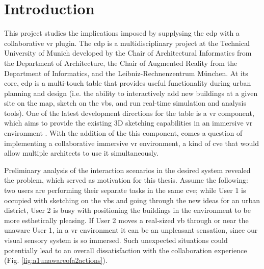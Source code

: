 
\chapter{Introduction}





This project studies the implications imposed by supplysing the \gls{cdp} with a collaborative \gls{vr} plugin.
The \gls{cdp} is a multidisciplinary project at the Technical University of Munich developed by the Chair of Architectural Informatics from the Department of Architecture, the Chair of Augmented Reality from the Department of Informatics, and the Leibniz-Rechnenzentrum M{\"u}nchen.
At its core, \gls{cdp} is a multi-touch table that provides useful functionality during urban planning and design (i.e. the ability to interactively add new buildings at a given site on the map, sketch on the \glspl{vb}, and run real-time simulation and analysis tools). One of the latest  development directions for the table is a \gls{vr} component, which aims to provide the existing 3D sketching capabilities in an immersive \gls{vr} environment \cite[p.~5]{lampe_cdp//vr-sketching_2017}. With the addition of the this component, comes a question of implementing a collaborative immersive \gls{vr} environment, a kind of \gls{cve} that would allow multiple architects to use it simultaneously.

Preliminary analysis of the interaction scenarios in the desired system revealed the problem, which served as motivation for this thesis. Assume the following: two users are performing their separate tasks in the same \gls{cve}; while User 1 is occupied with sketching on the \glspl{vb} and going through the new ideas for an urban district, User 2 is busy with positioning the buildings in the environment to be more esthetically pleasing. If User 2 moves a real-sized \gls{vb} through or near the unaware User 1, in a \gls{vr} environment it can be an unpleasant sensation, since our visual sensory system is so immersed. Such unexpected situations could potentially lead to an overall dissatisfaction with the collaboration experience (Fig. \ref{fig:a1unawareofa2actions}).

